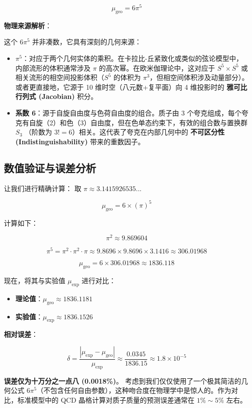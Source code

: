 \[\mu_{\text{geo}} = 6 \pi^5\]

\textbf{物理来源解析}：

这个 $6\pi^5$ 并非凑数，它具有深刻的几何来源：

\begin{itemize}
\item \textbf{$\pi^5$}：对应于两个几何实体的乘积。在卡拉比-丘紧致化或类似的弦论模型中，内部流形的体积通常涉及 $\pi$ 的高次幂。在欧米伽理论中，这对应于 \textbf{$S^5 \times S^5$} 或相关流形的相空间投影体积（$S^5$ 的体积为 $\pi^3$，但相空间体积涉及动量部分）。或者更直接地，它源于 10 维时空（八元数+复平面）向 4 维投影时的 \textbf{雅可比行列式 (Jacobian)} 积分。
\item \textbf{系数 6}：源于自旋自由度与色荷自由度的组合。质子由 3 个夸克组成，每个夸克有自旋（2）和色（3）自由度，但在色单态约束下，有效的组合数与置换群 $S_3$ （阶数为 $3! = 6$）相关。这代表了夸克在内部几何中的 \textbf{不可区分性 (Indistinguishability)} 带来的重数因子。
\end{itemize}

\subsection{数值验证与误差分析}

让我们进行精确计算：
取 $\pi \approx 3.1415926535...$

\[\mu_{\text{geo}} = 6 \times (\pi)^5\]

计算如下：

\[\pi^2 \approx 9.869604\]

\[\pi^5 = \pi^2 \cdot \pi^2 \cdot \pi \approx 9.8696 \times 9.8696 \times 3.1416 \approx 306.01968\]

\[\mu_{\text{geo}} = 6 \times 306.01968 \approx 1836.118\]

现在，将其与实验值 $\mu_{\text{exp}}$ 进行对比：

\begin{itemize}
\item \textbf{理论值}：$\mu_{\text{geo}} \approx 1836.1181$
\item \textbf{实验值}：$\mu_{\text{exp}} \approx 1836.1526$
\end{itemize}

\textbf{相对误差}：

\[\delta = \frac{|\mu_{\text{exp}} - \mu_{\text{geo}}|}{\mu_{\text{exp}}} \approx \frac{0.0345}{1836.15} \approx 1.8 \times 10^{-5}\]

\textbf{误差仅为十万分之一点八 (0.0018\%)}。
考虑到我们仅仅使用了一个极其简洁的几何公式 $6\pi^5$（不包含任何自由参数），这种吻合度在物理学中是惊人的。作为对比，标准模型中的 QCD 晶格计算对质子质量的预测误差通常在 $1\% \sim 5\%$ 左右。

